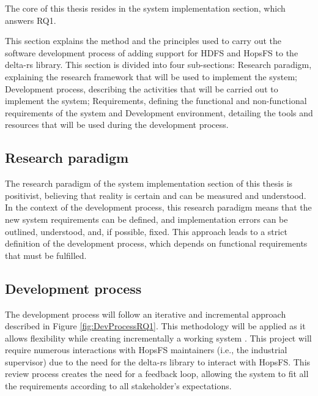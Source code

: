 The core of this thesis resides in the system implementation section, which answers RQ1.

This section explains the method and the principles used to carry out the software development process of adding support for \gls{HDFS} and \gls{HopsFS} to the delta-rs library. This section is divided into four sub-sections: Research paradigm, explaining the research framework that will be used to implement the system; Development process, describing the activities that will be carried out to implement the system; Requirements, defining the functional and non-functional requirements of the system and Development environment, detailing the tools and resources that will be used during the development process.

\subsection{Research paradigm}
The research paradigm of the system implementation section of this thesis is positivist, believing that reality is certain and can be measured and understood. 
In the context of the development process, this research paradigm means that the new system requirements can be defined, and implementation errors can be outlined, understood, and, if possible, fixed. This approach leads to a strict definition of the development process, which depends on functional requirements that must be fulfilled.

\subsection{Development process}
\label{subsec:dev_process}
The development process will follow an iterative and incremental approach described in Figure \ref{fig:DevProcessRQ1}. This methodology will be applied as it allows flexibility while creating incrementally a working system \cite{despa2014comparative}. This project will require numerous interactions with \gls{HopsFS} maintainers (i.e., the industrial supervisor) due to the need for the delta-rs library to interact with \gls{HopsFS}. This review process creates the need for a feedback loop, allowing the system to fit all the requirements according to all stakeholder's expectations.

